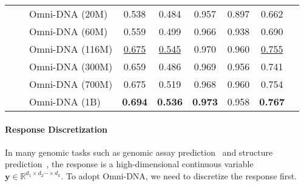 \begin{table*}[ht!]
{\begin{tabular}{@{}lllcccccc@{}}
                     &  
                     & \small Omni-DNA (20M)     & 0.538 & 0.484 & 0.957 & 0.897 & 0.662 \\
                     &                                & \small Omni-DNA (60M)      &0.559 & 0.499 & 0.966 & 0.938 & 0.690 \\
                     &                                & \small Omni-DNA (116M)  & \underline{0.675} & \underline{0.545} & 0.970 & 0.960   & \underline{0.755} \\
                     &                                & \small Omni-DNA (300M)    & 0.659 & 0.486 & 0.969    & 0.956& 0.741 \\
                     &                                & \small Omni-DNA (700M)       & 0.675 & 0.519 & 0.968  & 0.960 & 0.754 \\
                     &                                & \small Omni-DNA (1B)        & \textbf{0.694} & \textbf{0.536} & \textbf{0.973}  & 0.958  & \textbf{0.767} \\
\bottomrule
\end{tabular}
}
\vspace{-1em}
\end{table*}

\paragraph{Response Discretization} In many genomic tasks such as genomic assay prediction~\cite{avsec2021effective} and structure prediction~\cite{abramson2024accurate}, the response is a high-dimensional continuous variable $\mathbf{y} \in \mathbb{R}^{d_1 \times d_2\cdots \times d_k}$. To adopt Omni-DNA, we need to discretize the response first. 




